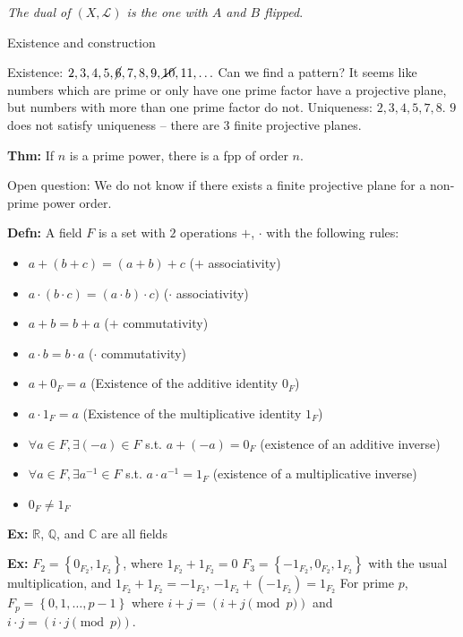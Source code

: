 \documentclass[10pt,letterpaper]{article}
\newcommand{\n}{\hfill\break}
\newcommand{\defn}[1]{\par\noindent\settowidth{\hangindent}{\textbf{Defn: }}\textbf{Defn: }#1\n}
\newcommand{\thm}[1]{\par\noindent\settowidth{\hangindent}{\textbf{Thm: }}\textbf{Thm: }#1\n}
\newcommand{\ex}[1]{\par\noindent\settowidth{\hangindent}{\textbf{Ex: }}\textbf{Ex: }#1\n}
\newcommand{\set}[1]{\left\{#1\right\}}
\newcommand{\rationals}{\mathbb{Q}}
\newcommand{\Q}{\rationals}
\newcommand{\reals}{\mathbb{R}}
\newcommand{\R}{\reals}
\newcommand{\complex}{\mathbb{C}}
\newcommand{\C}{\complex}
\newcommand{\inv}{^{-1}}
\newcommand{\st}{s.t.}
\begin{document}
\par\noindent\textit{The dual of $(X,\mathscr{L})$ is the one with $A$ and $B$ flipped}.\n

\par\noindent Existence and construction\n

\par\noindent Existence: $2,3,4,5,\cancel{6},7,8,9,\cancel{10},11,\ldots$\n
Can we find a pattern? It seems like numbers which are prime or only have one prime factor have a projective plane, but numbers with more than one prime factor do not.\n
Uniqueness: $2,3,4,5,7,8$. $9$ does not satisfy uniqueness -- there are $3$ finite projective planes.\n

\thm{If $n$ is a prime power, there is a fpp of order $n$.}

\par\noindent Open question: We do not know if there exists a finite projective plane for a non-prime power order.\n

\defn{A field $F$ is a set with $2$ operations $+$, $\cdot$ with the following rules:
\begin{itemize}
	\item $a+(b+c)=(a+b)+c$ ($+$ associativity)
	\item $a\cdot(b\cdot{}c)=(a\cdot{}b)\cdot{}c)$ ($\cdot$ associativity)
	\item $a+b=b+a$ ($+$ commutativity)
	\item $a\cdot{}b=b\cdot{}a$ ($\cdot$ commutativity)
	\item $a+0_{F}=a$ (Existence of the additive identity $0_{F}$)
	\item $a\cdot{}1_{F}=a$ (Existence of the multiplicative identity $1_{F}$)
	\item $\forall{}a\in{}F,\exists{}(-a)\in{}F$ \st{} $a+(-a)=0_{F}$ (existence of an additive inverse)
	\item $\forall{}a\in{}F,\exists{}a\inv\in{}F$ \st{} $a\cdot{}a\inv=1_{F}$ (existence of a multiplicative inverse)
	\item $0_{F}\ne{}1_{F}$
\end{itemize}}

\ex{$\R$, $\Q$, and $\C$ are all fields}

\ex{$F_{2}=\set{0_{F_{2}},1_{F_{2}}}$, where $1_{F_{2}}+1_{F_{2}}=0$\n
$F_{3}=\set{-1_{F_{2}},0_{F_{2}},1_{F_{2}}}$ with the usual multiplication, and $1_{F_{2}}+1_{F_{2}}=-1_{F_{2}}$, $-1_{F_{2}}+(-1_{F_{2}})=1_{F_{2}}$\n
For prime $p$, $F_{p}=\set{0,1,\ldots,p-1}$ where $i+j=(i+j\pmod{p})$ and $i\cdot{}j=(i\cdot{}j\pmod{p})$.}
\end{document}
